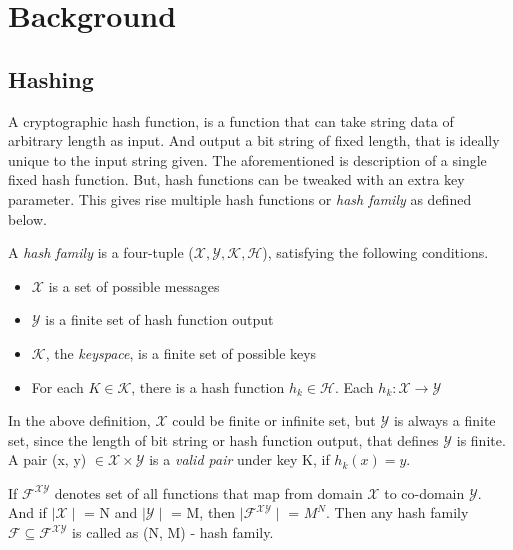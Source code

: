 \chapter{Background}

\section{Hashing}
A cryptographic hash function, is a function that can take string data of arbitrary length as input. 
And output a bit string of fixed length, that is ideally unique to the input string given. The 
aforementioned is description of a single fixed hash function. But, hash functions can be tweaked
with an extra key parameter. This gives rise multiple hash functions or \emph{hash family} as 
defined below. \cite{00005}

\begin{center}
  \framebox
  {
    \parbox{420pt}
    {
      A \emph{hash family} is a four-tuple ($\mathcal{X}, \mathcal{Y}, \mathcal{K}, \mathcal{H}$),
      satisfying the following conditions.
      \begin{itemize}
        \item $\mathcal{X}$ is a set of possible messages
        \item $\mathcal{Y}$ is a finite set of hash function output
        \item $\mathcal{K}$, the \emph{keyspace}, is a finite set of possible keys
        \item For each $K \in \mathcal{K}$, there is a hash function $h_{k} \in \mathcal{H}$. Each 
          $h_{k}: \mathcal{X} \to \mathcal{Y}$ 
      \end{itemize}
    }
  }
\end{center}
\vspace{4mm}

In the above definition, $\mathcal{X}$ could be finite or infinite set, but $\mathcal{Y}$ is always
a finite set, since the length of bit string or hash function output, that defines $\mathcal{Y}$ is
finite. A pair (x, y) $\in \mathcal{X} \times \mathcal{Y}$ is a \emph{valid pair} under key K, if 
$h_{k}(x) = y$.

If $\mathcal{F}^{\mathcal{X}\mathcal{Y}}$ denotes set of all functions that map from domain $\mathcal{X}$
to co-domain $\mathcal{Y}$. And if $\mid\mathcal{X}\mid$ = N and $\mid\mathcal{Y}\mid$ = M, then 
$\mid\mathcal{F}^{\mathcal{XY}}\mid$ = $M^{N}$. Then any hash family $\mathcal{F} \subseteq \mathcal{F}^{\mathcal{XY}}$
is called as (N, M) - hash family.

